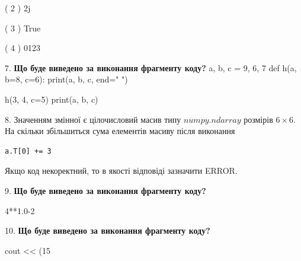 \documentclass[11pt]{article}
\begin{document}
( 2 ) 2j

( 3 ) True

( 4 ) 0123
\par\vspace{5mm}

7. \textbf{Що буде виведено за виконання фрагменту коду?}
a, b, c = 9, 6, 7
def h(a, b=8, c=6):
    print(a, b, c, end=" ")

h(3, 4, c=5)
print(a, b, c)
\par\vspace{5mm}

8. 
Значенням змінної  є цілочисловий масив типу $numpy.ndarray$ розмірів $6{\times}6$. На скільки збільшиться сума елементів масиву  після виконання
\begin{verbatim}
a.T[0] += 3
\end{verbatim}


Якщо код некоректний, то в якості відповіді зазначити ERROR.


\par\vspace{5mm}

9. \textbf{Що буде виведено за виконання фрагменту коду?}

4**1.0-2
\par\vspace{5mm}

10. \textbf{Що буде виведено за виконання фрагменту коду?}

cout << (15 %
\par\vspace{5mm}

\newpage
\end{document}
